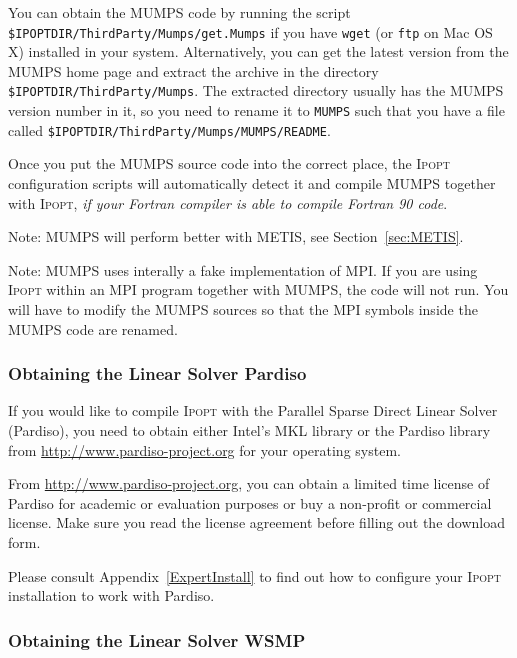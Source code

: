 \documentclass[10pt]{article}
\newcommand{\Ipopt}{\textsc{Ipopt}\xspace}
\begin{document}
You can obtain the MUMPS code by running the script
{\tt \$IPOPTDIR/ThirdParty/Mumps/get.Mumps} if you have {\tt wget} 
(or {\tt ftp} on Mac OS X) installed in your system. 
Alternatively, you can get the latest version
from the MUMPS home page and extract the archive in the
directory {\tt \$IPOPTDIR/ThirdParty/Mumps}.  The extracted
directory usually has the MUMPS version number in it, so you need to
rename it to {\tt MUMPS} such that you have a file called
{\tt \$IPOPTDIR/ThirdParty/Mumps/MUMPS/README}.

Once you put the MUMPS source code into the correct place, the \Ipopt
configuration scripts will automatically detect it and compile MUMPS
together with \Ipopt, \emph{if your Fortran compiler is able to compile
Fortran 90 code}.

Note: MUMPS will perform better with METIS, see
Section~\ref{sec:METIS}.

Note: MUMPS uses interally a fake implementation of MPI.  If you are
using \Ipopt within an MPI program together with MUMPS, the code will
not run.  You will have to modify the MUMPS sources so that the MPI
symbols inside the MUMPS code are renamed.

\subsubsection{Obtaining the Linear Solver Pardiso}\label{sec:Pardiso}

If you would like to compile \Ipopt with the Parallel Sparse Direct
Linear Solver (Pardiso), you need to obtain either Intel's MKL library
or the Pardiso library from \url{http://www.pardiso-project.org} for
your operating system.

From \url{http://www.pardiso-project.org},
you can obtain a limited time license of Pardiso for academic or
evaluation purposes or buy a non-profit or commercial
license. Make sure you read the license agreement before filling out
the download form.


Please consult Appendix~\ref{ExpertInstall} to find out how to
configure your \Ipopt installation to work with Pardiso.

\subsubsection{Obtaining the Linear Solver WSMP}\label{sec:WSMP}
\end{document}
